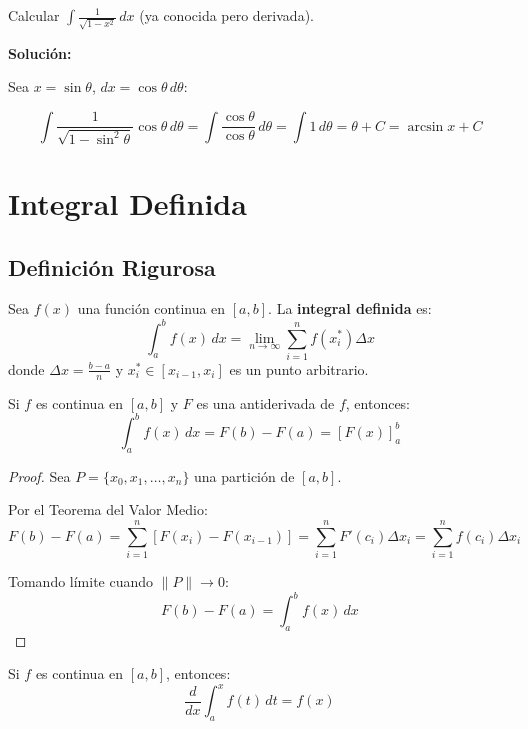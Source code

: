 \documentclass[12pt, a4paper]{book}
\begin{document}
\begin{ejemplo}
Calcular $\int \frac{1}{\sqrt{1-x^2}} \, dx$ (ya conocida pero derivada).

\textbf{Solución:}

Sea $x = \sin\theta$, $dx = \cos\theta \, d\theta$:

\[
\int \frac{1}{\sqrt{1-\sin^2\theta}} \cos\theta \, d\theta = \int \frac{\cos\theta}{\cos\theta} \, d\theta = \int 1 \, d\theta = \theta + C = \arcsin x + C
\]
\end{ejemplo}

\chapter{Integral Definida}

\section{Definición Rigurosa}

\begin{definicion}
Sea $f(x)$ una función continua en $[a,b]$. La \textbf{integral definida} es:
\[
\int_a^b f(x) \, dx = \lim_{n \to \infty} \sum_{i=1}^{n} f(x_i^*) \Delta x
\]
donde $\Delta x = \frac{b-a}{n}$ y $x_i^* \in [x_{i-1}, x_i]$ es un punto arbitrario.
\end{definicion}

\begin{teorema}
Si $f$ es continua en $[a,b]$ y $F$ es una antiderivada de $f$, entonces:
\[
\int_a^b f(x) \, dx = F(b) - F(a) = \left[F(x)\right]_a^b
\]
\end{teorema}

\begin{proof}
Sea $P = \{x_0, x_1, \ldots, x_n\}$ una partición de $[a,b]$.

Por el Teorema del Valor Medio:
\[
F(b) - F(a) = \sum_{i=1}^{n} [F(x_i) - F(x_{i-1})] = \sum_{i=1}^{n} F'(c_i)\Delta x_i = \sum_{i=1}^{n} f(c_i)\Delta x_i
\]

Tomando límite cuando $\|P\| \to 0$:
\[
F(b) - F(a) = \int_a^b f(x) \, dx
\]
\end{proof}

\begin{teorema}
Si $f$ es continua en $[a,b]$, entonces:
\[
\frac{d}{dx}\int_a^x f(t) \, dt = f(x)
\]
\end{teorema}
\end{document}
